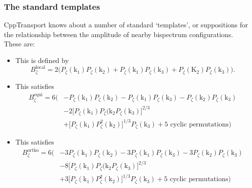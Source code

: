 \documentclass[11pt,a4paper]{article}
\newcommand{\Pzeta}{P_\zeta}
\newcommand{\Bzeta}{B_\zeta}
\newcommand{\vect}[1]{\bm{\mathrm{{#1}}}}
\newcommand{\packagefont}{\sffamily}
\newcommand{\CppTransport}{{\packagefont CppTransport}}
\newcommand{\semibold}[1]{{\fontseries{b}\selectfont{#1}}}
\begin{document}
\subsubsection{The standard templates}
{\CppTransport} knows about a number of standard `templates',
or suppositions for the relationship between the amplitude of
nearby bispectrum configurations.
These are:
\begin{itemize}
    \item \semibold{The local template.} This is defined by
    \begin{equation}
        \Bzeta^\text{local} =
            2
            \Big(
                \Pzeta(\vect{k}_1) \Pzeta(\vect{k}_2)
                + \Pzeta(\vect{k}_1) \Pzeta(\vect{k}_3)
                + \Pzeta(\vect{K}_2) \Pzeta(\vect{k}_3)
            \Big) .
    \end{equation}
    
    \item \semibold{The equilateral template.} This satisfies~\cite{Creminelli:2005hu}
    \begin{equation}
    \begin{split}
        \Bzeta^\text{equi} =
        6
        \Big(
        &
            {- \Pzeta(\vect{k}_1)} \Pzeta(\vect{k}_2)
            - \Pzeta(\vect{k}_1) \Pzeta(\vect{k}_3)
            - \Pzeta(\vect{k}_2) \Pzeta(\vect{k}_3)
        \\
        & -
            2 \big[ \Pzeta(\vect{k}_1) \Pzeta(\vect{k}_2
                \Pzeta(\vect{k}_3) \big]^{2/3}
        \\
        & +
            \big[
                \Pzeta(\vect{k}_1)
                \Pzeta^2(\vect{k}_2)
            \big]^{1/3}
            \Pzeta(\vect{k}_3)
            + \text{5 cyclic permutations}
        \Big)
    \end{split}
    \end{equation}
    
    \item \semibold{The orthogonal template.} This satisfies~\cite{Senatore:2009gt}
    \begin{equation}
    \begin{split}
        \Bzeta^\text{ortho} =
        6
        \Big(
        &
            {- 3\Pzeta(\vect{k}_1)} \Pzeta(\vect{k}_2)
            - 3\Pzeta(\vect{k}_1) \Pzeta(\vect{k}_3)
            - 3\Pzeta(\vect{k}_2) \Pzeta(\vect{k}_3)
        \\
        & -
            8 \big[ \Pzeta(\vect{k}_1) \Pzeta(\vect{k}_2
                \Pzeta(\vect{k}_3) \big]^{2/3}
        \\
        & +
            3 \big[
                \Pzeta(\vect{k}_1)
                \Pzeta^2(\vect{k}_2)
            \big]^{1/3}
            \Pzeta(\vect{k}_3)
            + \text{5 cyclic permutations}
        \Big)
    \end{split}
    \end{equation}
\end{itemize}
\end{document}
